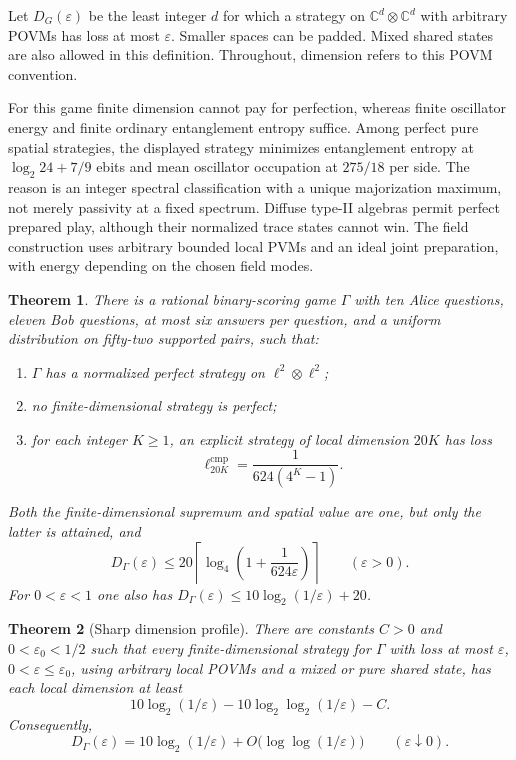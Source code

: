 \documentclass[11pt]{article}
\newtheorem{theorem}{Theorem}[section]
\theoremstyle{definition}
\newcommand{\eps}{\varepsilon}
\begin{document}
Let $D_G(\eps)$ be the least integer $d$ for which a strategy on $\mathbb C^d\otimes\mathbb C^d$ with arbitrary POVMs has loss at most $\eps$. Smaller spaces can be padded. Mixed shared states are also allowed in this definition. Throughout, dimension refers to this POVM convention.

For this game finite dimension cannot pay for perfection, whereas finite oscillator energy and finite ordinary entanglement entropy suffice. Among perfect pure spatial strategies, the displayed strategy minimizes entanglement entropy at $\log_2 24+7/9$ ebits and mean oscillator occupation at $275/18$ per side. The reason is an integer spectral classification with a unique majorization maximum, not merely passivity at a fixed spectrum. Diffuse type-II algebras permit perfect prepared play, although their normalized trace states cannot win. The field construction uses arbitrary bounded local PVMs and an ideal joint preparation, with energy depending on the chosen field modes.

\begin{theorem}\label{thm:main}
There is a rational binary-scoring game $\Gamma$ with ten Alice questions, eleven Bob questions, at most six answers per question, and a uniform distribution on fifty-two supported pairs, such that:
\begin{enumerate}
\item $\Gamma$ has a normalized perfect strategy on $\ell^2\otimes\ell^2$;
\item no finite-dimensional strategy is perfect;
\item for each integer $K\geq1$, an explicit strategy of local dimension $20K$ has loss
\begin{equation}\label{eq:exactloss}
\ell^{\mathrm{cmp}}_{20K}=\frac{1}{624(4^K-1)}.
\end{equation}
\end{enumerate}
Both the finite-dimensional supremum and spatial value are one, but only the latter is attained, and
\begin{equation}\label{eq:dimension}
D_\Gamma(\eps)\leq20\left\lceil\log_4\left(1+\frac{1}{624\eps}\right)\right\rceil\qquad(\eps>0).
\end{equation}
For $0<\eps<1$ one also has $D_\Gamma(\eps)\leq10\log_2(1/\eps)+20$.
\end{theorem}


\begin{theorem}[Sharp dimension profile]\label{thm:sharp}
There are constants $C>0$ and $0<\eps_0<1/2$ such that every
finite-dimensional strategy for $\Gamma$ with loss at most $\eps$,
$0<\eps\leq\eps_0$, using arbitrary local POVMs and a mixed or pure
shared state, has each local dimension at least
\begin{equation}\label{eq:sharplower}
10\log_2(1/\eps)-10\log_2\log_2(1/\eps)-C.
\end{equation}
Consequently,
\begin{equation}\label{eq:sharpdimension}
D_\Gamma(\eps)=10\log_2(1/\eps)+O\bigl(\log\log(1/\eps)\bigr)
\qquad(\eps\downarrow0).
\end{equation}
\end{theorem}
\end{document}
